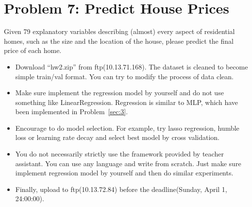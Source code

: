 \documentclass[12pt]{article}
\begin{document}
\section{Problem 7: Predict House Prices} \label{sec:4}
Given 79 explanatory variables describing (almost) every aspect of residential homes, such as the size  and the location of the house, please predict the final price of each home.

\begin{itemize}	
	\item  Download ``hw2.zip'' from ftp(10.13.71.168). The dataset is cleaned to become simple train/val format. You can try to modify the process of data clean.
	\item Make sure implement the regression model by yourself and do not use something like LinearRegression.  Regression is similar to MLP, which have been implemented in  Problem~\ref{sec:3}.

	\item Encourage to do model selection. For example, try lasso regression, humble loss or learning rate decay and select best model by cross validation.

	\item You do not necessarily strictly use the framework provided by teacher assistant. You can use any language and write from scratch. Just make sure implement regression model by yourself and then do similar experiments.
	\item Finally, upload to ftp(10.13.72.84) before the deadline(Sunday, April 1, 24:00:00).
\end{itemize}
\end{document}
